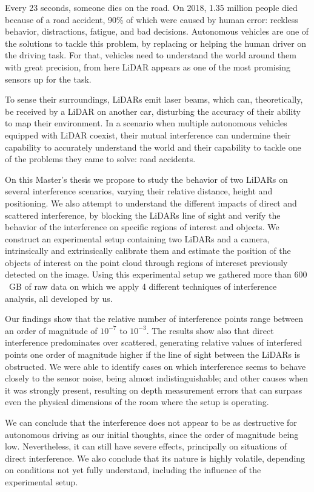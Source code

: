 Every 23 seconds, someone dies on the road. On 2018, 1.35 million people died because of a road accident, 90\% of which were caused by human error: reckless behavior, distractions, fatigue, and bad decisions. Autonomous vehicles are one of the solutions to tackle this problem, by replacing or helping the human driver on the driving task. For that, vehicles need to understand the world around them with great precision, from here LiDAR appears as one of the most promising sensors up for the task. 

To sense their surroundings, LiDARs emit laser beams, which can, theoretically, be received by a LiDAR on another car, disturbing the accuracy of their ability to map their environment. In a scenario when multiple autonomous vehicles equipped with LiDAR coexist, their mutual interference can undermine their capability to accurately understand the world and their capability to tackle one of the problems they came to solve: road accidents. 

On this Master's thesis we propose to study the behavior of two LiDARs on several interference scenarios, varying their relative distance, height and positioning. We also attempt to understand the different impacts of direct and scattered interference, by blocking the LiDARs line of sight and verify the behavior of the interference on specific regions of interest and objects. We construct an experimental setup containing two LiDARs and a camera, intrinsically and extrinsically calibrate them and estimate the position of the objects of interest on the point cloud through regions of intereset previously detected on the image. Using this experimental setup we gathered more than $600$~GB of raw data on which we apply 4 different techniques of interference analysis, all developed by us.

Our findings show that the relative number of interference points range between an order of magnitude of $10^{-7}$ to $10^{-3}$. The results show also that direct interference predominates over scattered, generating relative values of interfered points one order of magnitude higher if the line of sight between the LiDARs is obstructed. We were able to identify cases on which interference seems to behave closely to the sensor noise, being almost indistinguishable; and other causes when it was strongly present, resulting on depth measurement errors that can surpass even the physical dimensions of the room where the setup is operating. 

We can conclude that the interference does not appear to be as destructive for autonomous driving as our initial thoughts, since the order of magnitude being low. Nevertheless, it can still have severe effects, principally on situations of direct interference. We also conclude that its nature is highly volatile, depending on conditions not yet fully understand, including the influence of the experimental setup.

